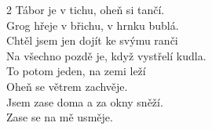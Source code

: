 \begin{multicols}{2}
\ve
Tábor je v tichu, oheň si tančí.\\
Grog hřeje v břichu, v hrnku bublá.\\
Chtěl jsem jen dojít ke svýmu ranči\\
Na všechno pozdě je, když vystřelí kudla.\\

\ve
To potom jeden, na zemi leží\\
Oheň se větrem zachvěje.\\
Jsem zase doma a za okny sněží.\\
Zase se na mě usměje.\\


\end{multicols}
\esong